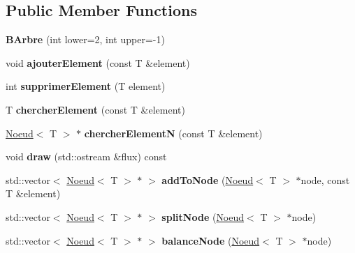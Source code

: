 \subsection*{Public Member Functions}
\begin{DoxyCompactItemize}
\item 
\hypertarget{classBArbre_abf97ee99962ab0fd16080db5c3b1f02f}{
{\bfseries BArbre} (int lower=2, int upper=-\/1)}
\label{classBArbre_abf97ee99962ab0fd16080db5c3b1f02f}

\item 
\hypertarget{classBArbre_a0612c34605cbe9236e447910a96d9f94}{
void {\bfseries ajouterElement} (const T \&element)}
\label{classBArbre_a0612c34605cbe9236e447910a96d9f94}

\item 
\hypertarget{classBArbre_afb35c6904f78d12510b7e763d31ef1f7}{
int {\bfseries supprimerElement} (T element)}
\label{classBArbre_afb35c6904f78d12510b7e763d31ef1f7}

\item 
\hypertarget{classBArbre_a54d1be427a621ce93d74eef55e8b1fae}{
T {\bfseries chercherElement} (const T \&element)}
\label{classBArbre_a54d1be427a621ce93d74eef55e8b1fae}

\item 
\hypertarget{classBArbre_a1b6e56dfd6fdb8af661c208ae9d645be}{
\hyperlink{classNoeud}{Noeud}$<$ T $>$ $\ast$ {\bfseries chercherElementN} (const T \&element)}
\label{classBArbre_a1b6e56dfd6fdb8af661c208ae9d645be}

\item 
\hypertarget{classBArbre_a3a8ad2d9d5a3fd60c678d79db29e4298}{
void {\bfseries draw} (std::ostream \&flux) const }
\label{classBArbre_a3a8ad2d9d5a3fd60c678d79db29e4298}

\item 
\hypertarget{classBArbre_ad22b69148af1ece9b1a1d47773862771}{
std::vector$<$ \hyperlink{classNoeud}{Noeud}$<$ T $>$ $\ast$ $>$ {\bfseries addToNode} (\hyperlink{classNoeud}{Noeud}$<$ T $>$ $\ast$node, const T \&element)}
\label{classBArbre_ad22b69148af1ece9b1a1d47773862771}

\item 
\hypertarget{classBArbre_a38bee8f1d2656cfe95c72fbc5b2c7e01}{
std::vector$<$ \hyperlink{classNoeud}{Noeud}$<$ T $>$ $\ast$ $>$ {\bfseries splitNode} (\hyperlink{classNoeud}{Noeud}$<$ T $>$ $\ast$node)}
\label{classBArbre_a38bee8f1d2656cfe95c72fbc5b2c7e01}

\item 
\hypertarget{classBArbre_ad6c3166fd15b5ee9ff3b82ab36c9c5f2}{
std::vector$<$ \hyperlink{classNoeud}{Noeud}$<$ T $>$ $\ast$ $>$ {\bfseries balanceNode} (\hyperlink{classNoeud}{Noeud}$<$ T $>$ $\ast$node)}
\label{classBArbre_ad6c3166fd15b5ee9ff3b82ab36c9c5f2}


\end{DoxyCompactItemize}
